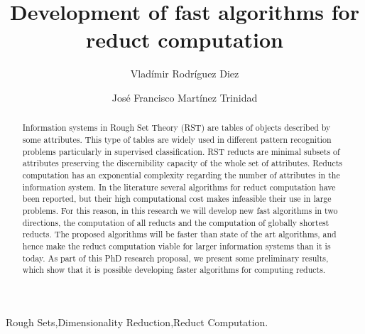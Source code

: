 \documentclass[authoryear,11pt]{elsarticle}
\begin{document}
	
	
	\title{Development of fast algorithms for reduct computation}
	
	\author{Vlad\'imir Rodr\'iguez Diez}
	\author{Jos\'e Francisco Mart\'inez Trinidad}
	
	\address{Computer Science Department\\National Institute of
	Astrophysics, Optics and Electronics\\
	Luis Enrique Erro \# 1, Santa Mar\'{\i}a Tonantzintla, Puebla,
	72840, M\'{e}xico} 
	
	
	
	\begin{abstract}
		Information systems in Rough Set Theory (RST) are tables of objects described by some attributes. 
		This type of tables are widely used in different pattern recognition problems particularly in 
		supervised classification. RST reducts are minimal subsets of attributes preserving 
		the discernibility capacity of the whole set of attributes. Reducts computation has an exponential
		complexity regarding the number of attributes in the information system. In the literature several
		algorithms for reduct computation have been reported, but their high computational cost makes 
		infeasible their use in large problems. For this reason, in this research we will develop new fast
		algorithms in two directions, the computation of all reducts and the computation of globally 
		shortest reducts. The proposed algorithms will be faster than state of the art algorithms, and hence 
		make the reduct computation viable for larger information systems than it is today. As part of this 
		PhD research proposal, we present some preliminary results, which show that it is possible developing
		faster algorithms for computing reducts.
	\end{abstract}
	
	\begin{keyword}
		Rough Sets\sep Dimensionality Reduction\sep Reduct Computation.
	\end{keyword}

	\maketitle

\pagebreak 
\tableofcontents
\pagebreak 

\end{document}
